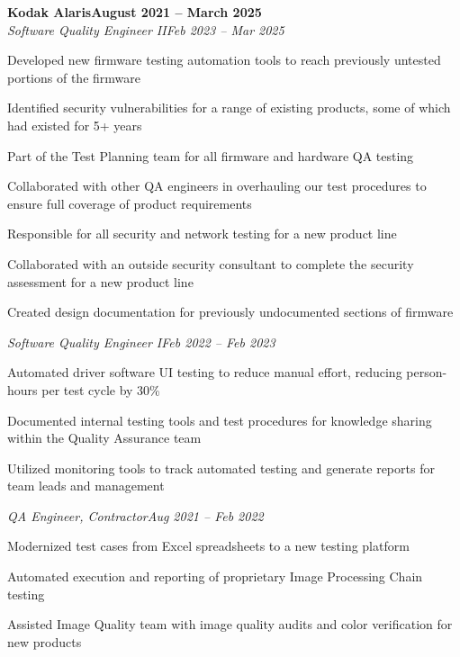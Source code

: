 \documentclass[letterpaper,10pt]{article}
\newcommand{\heading}[2]{
  \hspace{10pt}#1\hfill#2\\
}
\newcommand{\headingBf}[2]{
  \heading{\textbf{#1}}{\textbf{#2}}
}
\newcommand{\headingIt}[2]{
  \heading{\textit{#1}}{\textit{#2}}
}
\newenvironment{resume_list}{
  \vspace{-7pt}
  \begin{itemize}[itemsep=-2px, parsep=1pt, leftmargin=30pt]
}{
  \end{itemize}
}
\begin{document}
  \headingBf{Kodak Alaris}{August 2021 -- March 2025}
  \headingIt{Software Quality Engineer II}{Feb 2023 -- Mar 2025}
  \begin{resume_list}
    \item Developed new firmware testing automation tools to reach previously untested portions of the firmware
    \item Identified security vulnerabilities for a range of existing products, some of which had existed for 5+ years
    \item Part of the Test Planning team for all firmware and hardware QA testing
    \item Collaborated with other QA engineers in overhauling our test procedures to ensure full coverage of product requirements
    \item Responsible for all security and network testing for a new product line
    \item Collaborated with an outside security consultant to complete the security assessment for a new product line
    \item Created design documentation for previously undocumented sections of firmware
  \end{resume_list}
    \vspace{3pt}
  \headingIt{Software Quality Engineer I}{Feb 2022 -- Feb 2023}
  \begin{resume_list}
    \item Automated driver software UI testing to reduce manual effort, reducing person-hours per test cycle by 30\%
    \item Documented internal testing tools and test procedures for knowledge sharing within the Quality Assurance team
    \item Utilized monitoring tools to track automated testing and generate reports for team leads and management
  \end{resume_list}
    \vspace{3pt}
  \headingIt{QA Engineer, Contractor}{Aug 2021 -- Feb 2022}
  \begin{resume_list}
    \item Modernized test cases from Excel spreadsheets to a new testing platform
    \item Automated execution and reporting of proprietary Image Processing Chain testing
    \item Assisted Image Quality team with image quality audits and color verification for new products
  \end{resume_list}
\end{document}
